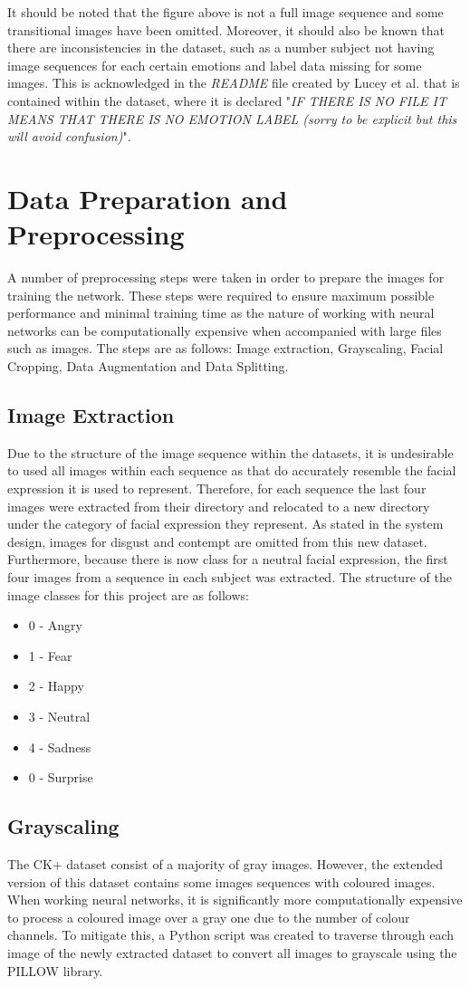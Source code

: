 It should be noted that the figure above is not a full image sequence and some transitional images have been omitted. Moreover, it should also be known that there are inconsistencies in the dataset, such as a number subject not having image sequences for each certain emotions and label data missing for some images. This is acknowledged in the \textit{README} file created by Lucey et al. that is contained within the dataset, where it is declared "\textit{IF THERE IS NO FILE IT MEANS THAT THERE IS NO EMOTION LABEL (sorry to be explicit but this will avoid confusion)}". 
\section{Data Preparation and Preprocessing}
A number of preprocessing steps were taken in order to prepare the images for training the network. These steps were required to ensure maximum possible performance and minimal training time as the nature of working with neural networks can be computationally expensive when accompanied with large files such as images. The steps are as follows: Image extraction, Grayscaling, Facial Cropping, Data Augmentation and Data Splitting. 
\subsection{Image Extraction}
Due to the structure of the image sequence within the datasets, it is undesirable to used all images within each sequence as that do accurately resemble the facial expression it is used to represent. Therefore, for each sequence the last four images were extracted from their directory and relocated to a new directory under the category of facial expression they represent. As stated in the system design, images for disgust and contempt are omitted from this new dataset. Furthermore, because there is now class for a neutral facial expression, the first four images from a sequence in each subject was extracted.
The structure of the image classes for this project are as follows:
\begin{itemize}
	\item 0 - Angry
	\item 1 - Fear
	\item 2 - Happy
	\item 3 - Neutral
	\item 4 - Sadness
	\item 0 - Surprise	
\end{itemize}


\subsection{Grayscaling}
The CK+ dataset consist of a majority of gray images. However, the extended version of this dataset contains some images sequences with coloured images. When working neural networks, it is significantly more computationally expensive to process a coloured image over a gray one due to the number of colour channels. To mitigate this, a Python script was created to traverse through each image of the newly extracted dataset to convert all images to grayscale using the PILLOW library. \\

